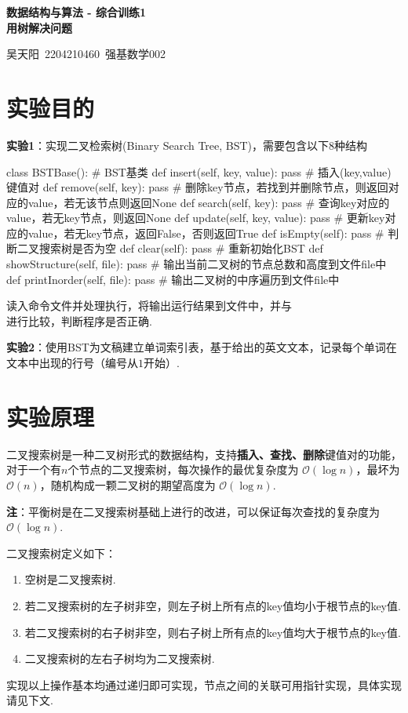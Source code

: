 \documentclass[12pt, a4paper, oneside]{ctexart}
\numberwithin{equation}{section}  %
\newenvironment{myTitle}[1]{
    \begin{center}
    {\zihao{-2}\bf #1\\}
    \zihao{-4}\it
}{\end{center}}  %
\def\O{\mathcal{O}}
\begin{document}
\clearpage
\begin{myTitle}{数据结构与算法 - 综合训练1\\用树解决问题}
    吴天阳\ 2204210460\ 强基数学002
\end{myTitle}
\section{实验目的}
\textbf{实验1}：实现二叉检索树(Binary Search Tree, BST)，需要包含以下$8$种结构
\begin{pythoncode}
class BSTBase():  # BST基类
    def insert(self, key, value): pass  # 插入(key,value)键值对
    def remove(self, key): pass  # 删除key节点，若找到并删除节点，则返回对应的value，若无该节点则返回None
    def search(self, key): pass  # 查询key对应的value，若无key节点，则返回None
    def update(self, key, value): pass  # 更新key对应的value，若无key节点，返回False，否则返回True
    def isEmpty(self): pass  # 判断二叉搜索树是否为空
    def clear(self): pass  # 重新初始化BST
    def showStructure(self, file): pass  # 输出当前二叉树的节点总数和高度到文件file中
    def printInorder(self, file): pass  # 输出二叉树的中序遍历到文件file中
\end{pythoncode}

读入命令文件并处理执行，将输出运行结果到文件中，并与\\进行比较，判断程序是否正确.

\textbf{实验2}：使用BST为文稿建立单词索引表，基于给出的英文文本，记录每个单词在文本中出现的行号（编号从$1$开始）.
\section{实验原理}
二叉搜索树是一种二叉树形式的数据结构，支持\textbf{插入、查找、删除}键值对的功能，对于一个有$n$个节点的二叉搜索树，每次操作的最优复杂度为 $\O(\log n)$，最坏为 $\O(n)$，随机构成一颗二叉树的期望高度为 $\O(\log n)$.

\textbf{注}：平衡树是在二叉搜索树基础上进行的改进，可以保证每次查找的复杂度为 $\O(\log n)$.

二叉搜索树定义如下：
\begin{enumerate}
    \item 空树是二叉搜索树.
    \item 若二叉搜索树的左子树非空，则左子树上所有点的key值均小于根节点的key值.
    \item 若二叉搜索树的右子树非空，则右子树上所有点的key值均大于根节点的key值.
    \item 二叉搜索树的左右子树均为二叉搜索树.
\end{enumerate}
实现以上操作基本均通过递归即可实现，节点之间的关联可用指针实现，具体实现请见下文.
\end{document}

